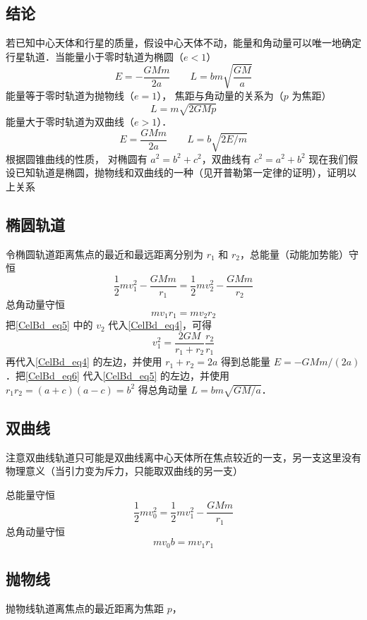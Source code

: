 

\subsection{结论}
若已知中心天体和行星的质量，假设中心天体不动，能量和角动量可以唯一地确定行星轨道．当能量小于零时轨道为椭圆（$e<1$）
\begin{equation}
E=-\frac{GMm}{2a} \qquad  L = bm \sqrt{\frac{GM}{a}}
\end{equation}
能量等于零时轨道为抛物线（$e=1$）， 焦距与角动量的关系为（$p$ 为焦距）
\begin{equation}
L = m \sqrt{2GMp}
\end{equation}
能量大于零时轨道为双曲线（$e>1$）．
\begin{equation}
E=\frac{GMm}{2a}  \qquad  L = b \sqrt{2E/m}
\end{equation}
根据圆锥曲线的性质， 对椭圆有 $a^2=b^2+c^2$，双曲线有 $c^2=a^2+b^2$
现在我们假设已知轨道是椭圆，抛物线和双曲线的一种（见开普勒第一定律的证明），证明以上关系

\subsection{椭圆轨道}
令椭圆轨道距离焦点的最近和最远距离分别为 $r_1$ 和 $r_2$，总能量（动能加势能）守恒
\begin{equation}\label{CelBd_eq4}
\frac{1}{2} m v_1^2 - \frac{GMm}{r_1} = \frac{1}{2} mv_2^2 - \frac{GMm}{r_2}
\end{equation}
总角动量守恒
\begin{equation}\label{CelBd_eq5}
mv_1 r_1 = mv_2 r_2
\end{equation}
把\autoref{CelBd_eq5} 中的 $v_2$ 代入\autoref{CelBd_eq4}，可得
\begin{equation}\label{CelBd_eq6}
v_1^2 = \frac{2GM}{r_1 + r_2} \frac{r_2}{r_1}
\end{equation}
再代入\autoref{CelBd_eq4} 的左边，并使用 $r_1+r_2=2a$ %
得到总能量 $E=-GMm/(2a)$．把\autoref{CelBd_eq6} 代入\autoref{CelBd_eq5} 的左边，并使用 $r_1 r_2 = (a+c)(a-c) =b^2$ %
得总角动量 $L = bm \sqrt{GM/a}$．

\subsection{双曲线}
注意双曲线轨道只可能是双曲线离中心天体所在焦点较近的一支，另一支这里没有物理意义（当引力变为斥力，只能取双曲线的另一支）

总能量守恒
\begin{equation}
\frac{1}{2} mv_0^2 = \frac{1}{2} mv_1^2 - \frac{GMm}{r_1}
\end{equation}
总角动量守恒
\begin{equation}
m v_0 b = m v_1 r_1
\end{equation}

\subsection{抛物线}
抛物线轨道离焦点的最近距离为焦距 $p$，

